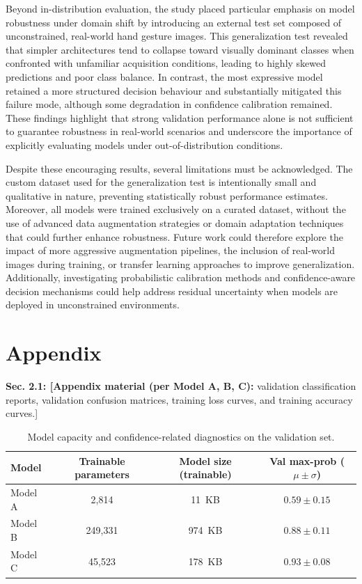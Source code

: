 \documentclass{article}
\begin{document}
Beyond in-distribution evaluation, the study placed particular emphasis
on model robustness under domain shift by introducing an external test
set composed of unconstrained, real-world hand gesture images. This
generalization test revealed that simpler architectures tend to collapse
toward visually dominant classes when confronted with unfamiliar
acquisition conditions, leading to highly skewed predictions and poor
class balance. In contrast, the most expressive model retained a more
structured decision behaviour and substantially mitigated this failure
mode, although some degradation in confidence calibration remained.
These findings highlight that strong validation performance alone is not
sufficient to guarantee robustness in real-world scenarios and
underscore the importance of explicitly evaluating models under
out-of-distribution conditions.

Despite these encouraging results, several limitations must be
acknowledged. The custom dataset used for the generalization test is
intentionally small and qualitative in nature, preventing statistically
robust performance estimates. Moreover, all models were trained
exclusively on a curated dataset, without the use of advanced data
augmentation strategies or domain adaptation techniques that could
further enhance robustness. Future work could therefore explore the
impact of more aggressive augmentation pipelines, the inclusion of
real-world images during training, or transfer learning approaches to
improve generalization. Additionally, investigating probabilistic
calibration methods and confidence-aware decision mechanisms could help
address residual uncertainty when models are deployed in unconstrained
environments.



\section*{Appendix}
\appendix

\textbf{Sec. 2.1: {[}Appendix material (per Model A, B, C):} validation
classification reports, validation confusion matrices, training loss
curves, and training accuracy curves.{]}

\begin{table}[h]
\centering
\caption{Model capacity and confidence-related diagnostics on the validation set.}
\label{tab:model_capacity}
\begin{tabular}{lccc}
\hline
\textbf{Model} &
\textbf{Trainable parameters} &
\textbf{Model size (trainable)} &
\textbf{Val max-prob ($\mu \pm \sigma$)} \\
\hline
Model A & 2{,}814   & 11~KB   & $0.59 \pm 0.15$ \\
Model B & 249{,}331 & 974~KB  & $0.88 \pm 0.11$ \\
Model C & 45{,}523  & 178~KB  & $0.93 \pm 0.08$ \\
\hline
\end{tabular}
\end{table}
\end{document}
